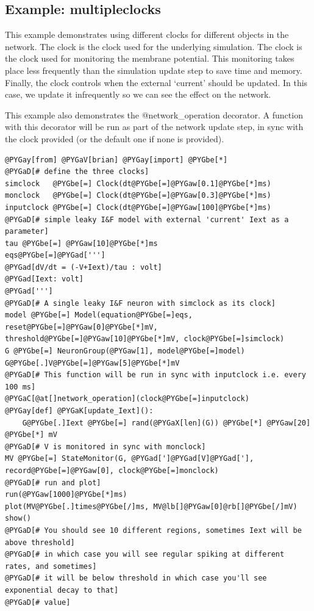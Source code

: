 \documentclass[letterpaper,10pt]{manual}
\begin{document}
\resetcurrentobjects
{}

\hypertarget{index-39}{}\subsection{Example: multipleclocks}

This example demonstrates using different clocks for different objects
in the network. The clock  is the clock used for the
underlying simulation. The clock  is the clock used for
monitoring the membrane potential. This monitoring takes place less
frequently than the simulation update step to save time and memory.
Finally, the clock  controls when the external `current'
 should be updated. In this  case, we update it infrequently
so we can see the effect on the network.

This example also demonstrates the @network\_operation decorator. A
function with this decorator will be run as part of the network
update step, in sync with the clock provided (or the default one
if none is provided).

\begin{Verbatim}[commandchars=@\[\]]
@PYGay[from] @PYGaV[brian] @PYGay[import] @PYGbe[*]
@PYGaD[# define the three clocks]
simclock   @PYGbe[=] Clock(dt@PYGbe[=]@PYGaw[0.1]@PYGbe[*]ms)
monclock   @PYGbe[=] Clock(dt@PYGbe[=]@PYGaw[0.3]@PYGbe[*]ms)
inputclock @PYGbe[=] Clock(dt@PYGbe[=]@PYGaw[100]@PYGbe[*]ms)
@PYGaD[# simple leaky I&F model with external 'current' Iext as a parameter]
tau @PYGbe[=] @PYGaw[10]@PYGbe[*]ms
eqs@PYGbe[=]@PYGad[''']
@PYGad[dV/dt = (-V+Iext)/tau : volt]
@PYGad[Iext: volt]
@PYGad[''']
@PYGaD[# A single leaky I&F neuron with simclock as its clock]
model @PYGbe[=] Model(equation@PYGbe[=]eqs, reset@PYGbe[=]@PYGaw[0]@PYGbe[*]mV, threshold@PYGbe[=]@PYGaw[10]@PYGbe[*]mV, clock@PYGbe[=]simclock)
G @PYGbe[=] NeuronGroup(@PYGaw[1], model@PYGbe[=]model)
G@PYGbe[.]V@PYGbe[=]@PYGaw[5]@PYGbe[*]mV
@PYGaD[# This function will be run in sync with inputclock i.e. every 100 ms]
@PYGaC[@at[]network_operation](clock@PYGbe[=]inputclock)
@PYGay[def] @PYGaK[update_Iext]():
    G@PYGbe[.]Iext @PYGbe[=] rand(@PYGaX[len](G)) @PYGbe[*] @PYGaw[20] @PYGbe[*] mV
@PYGaD[# V is monitored in sync with monclock]
MV @PYGbe[=] StateMonitor(G, @PYGad[']@PYGad[V]@PYGad['], record@PYGbe[=]@PYGaw[0], clock@PYGbe[=]monclock)
@PYGaD[# run and plot]
run(@PYGaw[1000]@PYGbe[*]ms)
plot(MV@PYGbe[.]times@PYGbe[/]ms, MV@lb[]@PYGaw[0]@rb[]@PYGbe[/]mV)
show()
@PYGaD[# You should see 10 different regions, sometimes Iext will be above threshold]
@PYGaD[# in which case you will see regular spiking at different rates, and sometimes]
@PYGaD[# it will be below threshold in which case you'll see exponential decay to that]
@PYGaD[# value]
\end{Verbatim}
\end{document}
